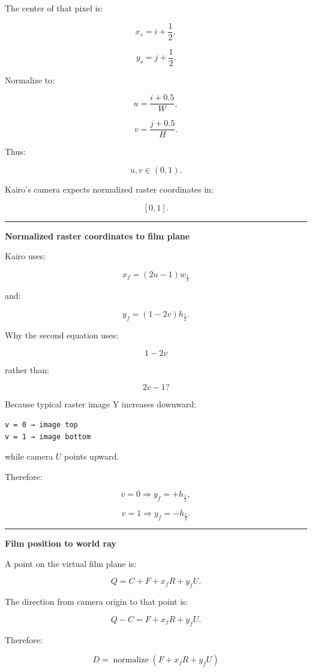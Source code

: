 The center of that pixel is:

\[
x_s=i+\frac12,
\]

\[
y_s=j+\frac12.
\]

Normalize to:

\[
u=\frac{i+0.5}{W},
\]

\[
v=\frac{j+0.5}{H}.
\]

Thus:

\[
u,v\in(0,1).
\]

Kairo's camera expects normalized raster coordinates in:

\[
[0,1].
\]

\begin{center}\rule{0.5\linewidth}{0.5pt}\end{center}

\textbf{Normalized raster coordinates to film plane}

Kairo uses:

\[
x_f=(2u-1)w_{\frac12}
\]

and:

\[
y_f=(1-2v)h_{\frac12}.
\]

Why the second equation uses:

\[
1-2v
\]

rather than:

\[
2v-1?
\]

Because typical raster image Y increases downward:

\begin{verbatim}
v = 0 → image top
v = 1 → image bottom
\end{verbatim}

while camera \(U\) points upward.

Therefore:

\[
v=0
\Rightarrow
y_f=+h_{\frac12},
\]

\[
v=1
\Rightarrow
y_f=-h_{\frac12}.
\]

\begin{center}\rule{0.5\linewidth}{0.5pt}\end{center}

\textbf{Film position to world ray}

A point on the virtual film plane is:

\[
Q=
C+
F+
x_fR+
y_fU.
\]

The direction from camera origin to that point is:

\[
Q-C
=
F+x_fR+y_fU.
\]

Therefore:

\[
\boxed{
D=
\operatorname{normalize}
(
F+x_fR+y_fU
)
}
\]

